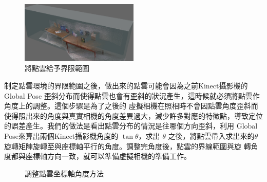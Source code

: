 
\begin{figure}
\begin{center}
  \includegraphics[width=0.5\textwidth]{figures/Bounding_Box.jpg}
  \caption{將點雲給予界限範圍}
  \label{fig:Bounding Box}
\end{center}
\end{figure}   
    
    制定點雲環境的界限範圍之後，做出來的點雲可能會因為之前Kinect攝影機的 Global Pose 歪斜分布而使得點雲也會有歪斜的狀況產生，這時候就必須將點雲作角度上的調整。這個步驟是為了之後的
    虛擬相機在照相時不會因點雲角度歪斜而使得照出來的角度與真實相機的角度差異過大，減少許多對應的特徵點，導致定位的誤差產生。我們的做法是看出點雲分布的情況是往哪個方向歪斜，利用
     Global Pose來算出兩個Kinect攝影機角度的 $\tan \theta$，求出 $\theta$ 之後，將點雲帶入求出來的$\theta$旋轉矩陣旋轉至與座標軸平行的角度。調整完角度後，點雲的界線範圍與旋
     轉角度都與座標軸方向一致，就可以準備虛擬相機的準備工作。

    
    
\begin{figure}
  \begin{center}
  \end{center}
  \caption{調整點雲坐標軸角度方法 }
  \label{fig:rotate axis}
\end{figure}
    
